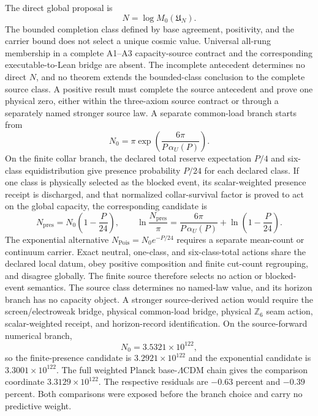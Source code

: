 The direct global proposal is
\[
N=\log M_0(\mathfrak U_N).
\]
The bounded completion class defined by base agreement, positivity, and the
carrier bound does not select a unique cosmic value. Universal all-rung
membership in a complete A1--A3 capacity-source contract and the corresponding
executable-to-Lean bridge are absent. The incomplete antecedent determines no
direct \(N\), and no theorem extends the bounded-class conclusion to the
complete source class. A
positive result must complete the source antecedent and prove one physical
zero, either within the three-axiom source contract or through a separately
named stronger source law. A separate
common-load branch starts from
\[
N_0=\pi\exp\!\left(\frac{6\pi}{P\,\alpha_U(P)}\right).
\]
On the finite collar branch, the declared total reserve expectation \(P/4\)
and six-class equidistribution give presence probability \(P/24\) for each
declared class. If one class is physically selected as the blocked event, its
scalar-weighted presence receipt is discharged, and that normalized
collar-survival factor is proved to act on the global capacity, the
corresponding candidate is
\[
N_{\mathrm{pres}}=N_0\left(1-\frac{P}{24}\right),
\qquad
\ln\frac{N_{\mathrm{pres}}}{\pi}
=
\frac{6\pi}{P\,\alpha_U(P)}
+\ln\left(1-\frac{P}{24}\right).
\]
The exponential alternative \(N_{\mathrm{Pois}}=N_0e^{-P/24}\) requires a
separate mean-count or continuum carrier. Exact neutral, one-class, and
six-class-total actions share the declared local datum, obey positive
composition and finite cut-count regrouping, and disagree globally. The
finite source therefore selects no action or blocked-event semantics. The
source class determines no named-law value, and its horizon branch has no
capacity object. A stronger source-derived action would
require the screen/electroweak bridge, physical common-load bridge, physical
\(\mathbb Z_6\) seam action, scalar-weighted receipt, and horizon-record
identification. On the source-forward numerical
branch,
\[
N_0=3.5321\times10^{122},
\]
so the finite-presence candidate is
\(3.2921\times10^{122}\) and the exponential candidate is
\(3.3001\times10^{122}\). The full weighted Planck
base-\(\Lambda\)CDM chain gives the comparison coordinate
\(3.3129\times10^{122}\). The respective residuals are
\(-0.63\) percent and \(-0.39\) percent. Both comparisons were exposed before
the branch choice and carry no predictive weight.
